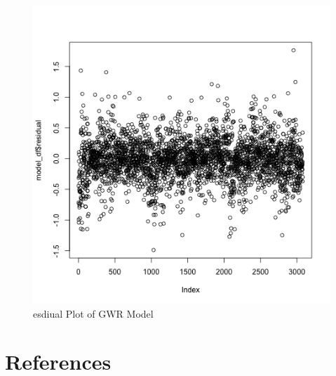 \documentclass[
]{article}
\begin{document}
\begin{figure}[H]

{\centering \includegraphics{residual_plot.png}

}

\caption{esdiual Plot of GWR Model}

\end{figure}%

\newpage{}

\section{References}\label{references}
\end{document}
